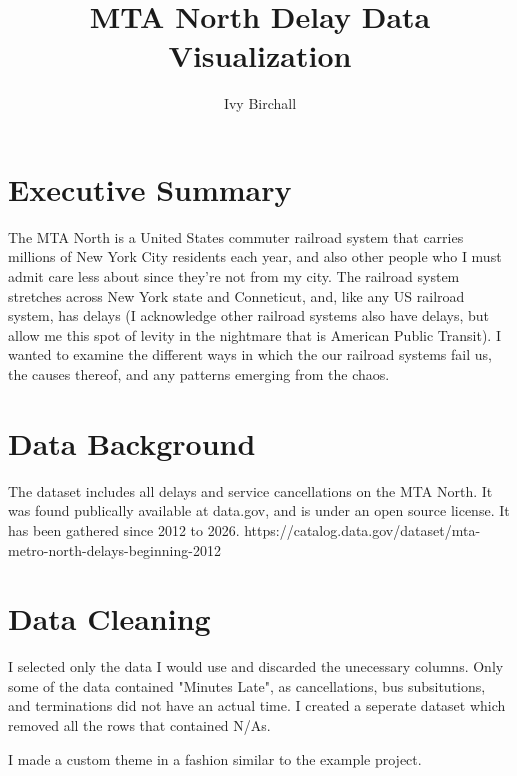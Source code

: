 \documentclass[]{article}
\title{MTA North Delay Data Visualization}
\author{Ivy Birchall}
\begin{document}
\maketitle


\section{Executive Summary}
The MTA North is a United States commuter railroad system that carries millions of New York City residents each year, and also other people who I must admit care less about since they're not from my city. The railroad system stretches across New York state and Conneticut, and, like any US railroad system, has delays (I acknowledge other railroad systems also have delays, but allow me this spot of levity in the nightmare that is American Public Transit). I wanted to examine the different ways in which the our railroad systems fail us, the causes thereof, and any patterns emerging from the chaos.

\vspace{.25cm}



\section{Data Background}
The dataset includes all delays and service cancellations on the MTA North. It was found publically available at data.gov, and is under an open source license. It has been gathered since 2012 to 2026.
https://catalog.data.gov/dataset/mta-metro-north-delays-beginning-2012
\vspace{.25cm}



\section{Data Cleaning}
I selected only the data I would use and discarded the unecessary columns. 
Only some of the data contained "Minutes Late", as cancellations, bus subsitutions, and terminations did not have an actual time. I created a seperate dataset which removed all the rows that contained N/As.



I made a custom theme in a fashion similar to the example project.



\end{document}
